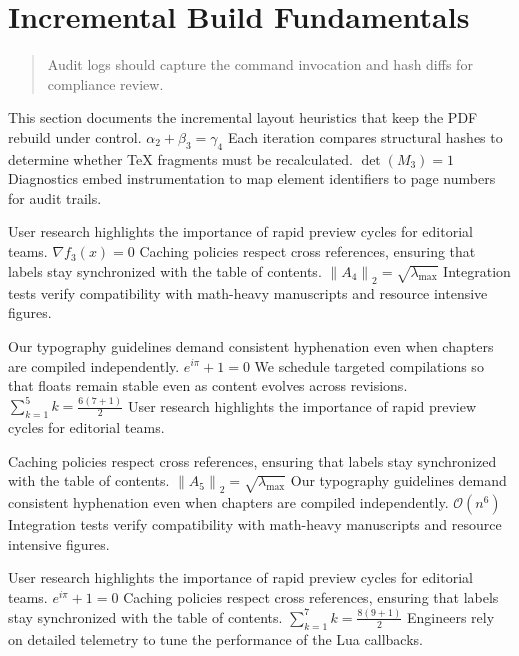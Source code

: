 
    \section{Incremental Build Fundamentals}
    
    \begin{quote}
      Audit logs should capture the command invocation and hash diffs for compliance review.
    \end{quote}
  
    This section documents the incremental layout heuristics that keep the PDF rebuild under control.  $\alpha_{2} + \beta_{3} = \gamma_{4}$  Each iteration compares structural hashes to determine whether TeX fragments must be recalculated.  $\det(M_{3}) = 1$  Diagnostics embed instrumentation to map element identifiers to page numbers for audit trails.
    \par
  
    User research highlights the importance of rapid preview cycles for editorial teams.  $\nabla f_{3}(x) = 0$  Caching policies respect cross references, ensuring that labels stay synchronized with the table of contents.  $\left\|A_{4}\right\|_{2} = \sqrt{\lambda_{\max}}$  Integration tests verify compatibility with math-heavy manuscripts and resource intensive figures.
    \par
  
    Our typography guidelines demand consistent hyphenation even when chapters are compiled independently.  $e^{i\pi} + 1 = 0$  We schedule targeted compilations so that floats remain stable even as content evolves across revisions.  $\sum_{k=1}^{5} k = \frac{6(7+1)}{2}$  User research highlights the importance of rapid preview cycles for editorial teams.
    \par
  
    Caching policies respect cross references, ensuring that labels stay synchronized with the table of contents.  $\left\|A_{5}\right\|_{2} = \sqrt{\lambda_{\max}}$  Our typography guidelines demand consistent hyphenation even when chapters are compiled independently.  $\mathcal{O}(n^{6})$  Integration tests verify compatibility with math-heavy manuscripts and resource intensive figures.
    \par
  
    User research highlights the importance of rapid preview cycles for editorial teams.  $e^{i\pi} + 1 = 0$  Caching policies respect cross references, ensuring that labels stay synchronized with the table of contents.  $\sum_{k=1}^{7} k = \frac{8(9+1)}{2}$  Engineers rely on detailed telemetry to tune the performance of the Lua callbacks.
    \par
  
